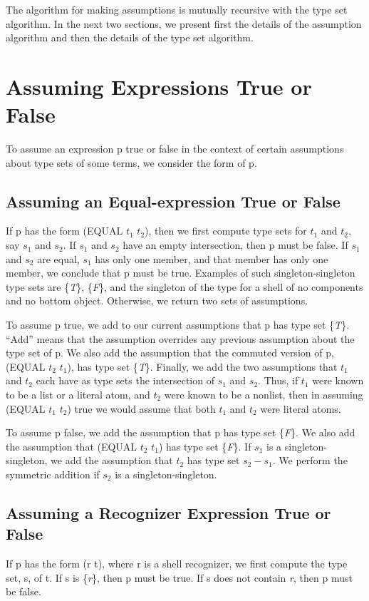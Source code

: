 \documentclass[11pt]{book}
\newcommand{\pubinlineunderline}[1]{\emph{#1}}
\newcommand{\pubdefaulttextsize}{\large}
\begin{document}
The algorithm for making assumptions is mutually
recursive with the type set algorithm.  In the
next two sections, we present first the details of the
assumption algorithm and then the details of the
type set algorithm.
\section{Assuming Expressions True or False}
\pubdefaulttextsize
To assume an expression
p true or false in the context of certain assumptions
about type sets of some terms,  we consider the
form of p.
\subsection{Assuming an Equal-expression True or False}
\pubdefaulttextsize
If p has the form (EQUAL $t_{1}$ $t_{2}$), then
we first compute type sets for $t_{1}$ and $t_{2}$, say $s_{1}$ and $s_{2}$.
If $s_{1}$ and $s_{2}$ have an empty intersection, then p
must be false.  If $s_{1}$ and $s_{2}$ are equal,
$s_{1}$ has only one member, and that member has only one member,
we conclude that p
must be true.  Examples of such singleton-singleton type sets are
\{\pubinlineunderline{T}\}, \{\pubinlineunderline{F}\}, and the  singleton of the type 
for a  shell 
of no components and no bottom object.  Otherwise, we return two
sets of assumptions.

To assume p true, we add                
to our current   assumptions that p has type set \{\pubinlineunderline{T}\}.
``Add'' means that the
assumption overrides any previous assumption about the type set of p.
We also add the assumption that the commuted version of p, (EQUAL $t_{2}$ $t_{1}$),
has type set \{\pubinlineunderline{T}\}.  Finally, we add the two assumptions that $t_{1}$ and $t_{2}$ each
have as type sets the intersection of
$s_{1}$ and $s_{2}$.  Thus, if $t_{1}$ were known to be a list or a literal atom,
and $t_{2}$ were known to be a nonlist, then in  assuming (EQUAL $t_{1}$ $t_{2}$)
true we would assume that both $t_{1}$ and $t_{2}$ were literal atoms.

To  assume p false, we add      
the assumption that p has type set \{\pubinlineunderline{F}\}.
We also add the assumption  that (EQUAL $t_{2}$ $t_{1}$) has type
set \{\pubinlineunderline{F}\}.  If $s_{1}$ is a singleton-singleton, we add
the assumption that $t_{2}$ has
type set $s_{2} -s_{1}$.  We perform the symmetric addition
if $s_{2}$ is a singleton-singleton.
\subsection{Assuming a Recognizer Expression True or False}
\pubdefaulttextsize
If p  has the form (r t), where r is a shell recognizer,
we first compute the type set, s, of t.  If s is  \{\pubinlineunderline{r}\}, then
p must be true.  If s does not contain \pubinlineunderline{r}, then p must be false.
\end{document}
